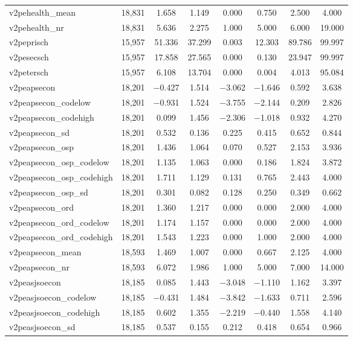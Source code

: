 \begin{table}[!htbp]
\begin{tabular}{@{\extracolsep{5pt}}lccccccc}
v2pehealth\_mean & 18,831 & 1.658 & 1.149 & 0.000 & 0.750 & 2.500 & 4.000 \\ 
v2pehealth\_nr & 18,831 & 5.636 & 2.275 & 1.000 & 5.000 & 6.000 & 19.000 \\ 
v2peprisch & 15,957 & 51.336 & 37.299 & 0.003 & 12.303 & 89.786 & 99.997 \\ 
v2pesecsch & 15,957 & 17.858 & 27.565 & 0.000 & 0.130 & 23.947 & 99.997 \\ 
v2petersch & 15,957 & 6.108 & 13.704 & 0.000 & 0.004 & 4.013 & 95.084 \\ 
v2peapsecon & 18,201 & $-$0.427 & 1.514 & $-$3.062 & $-$1.646 & 0.592 & 3.638 \\ 
v2peapsecon\_codelow & 18,201 & $-$0.931 & 1.524 & $-$3.755 & $-$2.144 & 0.209 & 2.826 \\ 
v2peapsecon\_codehigh & 18,201 & 0.099 & 1.456 & $-$2.306 & $-$1.018 & 0.932 & 4.270 \\ 
v2peapsecon\_sd & 18,201 & 0.532 & 0.136 & 0.225 & 0.415 & 0.652 & 0.844 \\ 
v2peapsecon\_osp & 18,201 & 1.436 & 1.064 & 0.070 & 0.527 & 2.153 & 3.936 \\ 
v2peapsecon\_osp\_codelow & 18,201 & 1.135 & 1.063 & 0.000 & 0.186 & 1.824 & 3.872 \\ 
v2peapsecon\_osp\_codehigh & 18,201 & 1.711 & 1.129 & 0.131 & 0.765 & 2.443 & 4.000 \\ 
v2peapsecon\_osp\_sd & 18,201 & 0.301 & 0.082 & 0.128 & 0.250 & 0.349 & 0.662 \\ 
v2peapsecon\_ord & 18,201 & 1.360 & 1.217 & 0.000 & 0.000 & 2.000 & 4.000 \\ 
v2peapsecon\_ord\_codelow & 18,201 & 1.174 & 1.157 & 0.000 & 0.000 & 2.000 & 4.000 \\ 
v2peapsecon\_ord\_codehigh & 18,201 & 1.543 & 1.223 & 0.000 & 1.000 & 2.000 & 4.000 \\ 
v2peapsecon\_mean & 18,593 & 1.469 & 1.007 & 0.000 & 0.667 & 2.125 & 4.000 \\ 
v2peapsecon\_nr & 18,593 & 6.072 & 1.986 & 1.000 & 5.000 & 7.000 & 14.000 \\ 
v2peasjsoecon & 18,185 & 0.085 & 1.443 & $-$3.048 & $-$1.110 & 1.162 & 3.397 \\ 
v2peasjsoecon\_codelow & 18,185 & $-$0.431 & 1.484 & $-$3.842 & $-$1.633 & 0.711 & 2.596 \\ 
v2peasjsoecon\_codehigh & 18,185 & 0.602 & 1.355 & $-$2.219 & $-$0.440 & 1.558 & 4.140 \\ 
v2peasjsoecon\_sd & 18,185 & 0.537 & 0.155 & 0.212 & 0.418 & 0.654 & 0.966 \\ 

\end{tabular}
\end{table}
